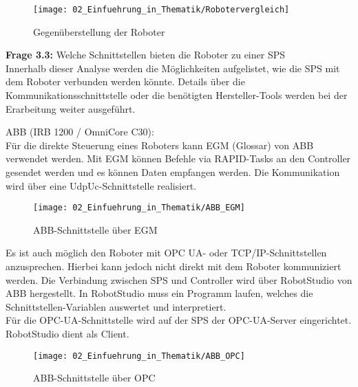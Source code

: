 		\begin{figure}[h!]
			\centering
			\texttt{[image: 02\_Einfuehrung\_in\_Thematik/Robotervergleich]}
			\captionsetup{justification=centering}
			\caption{Gegenüberstellung der Roboter}
			\label{fig:Robotervergleich}
		\end{figure}
	\vspace{3mm}
	
	\newpage
	
	\textbf{Frage 3.3:} Welche Schnittstellen bieten die Roboter zu einer SPS \vspace{2mm} 
	\\
		Innerhalb dieser Analyse werden die Möglichkeiten aufgelistet, wie die SPS mit dem Roboter verbunden werden könnte. Details über die Kommunikationsschnittstelle oder die benötigten Hersteller-Tools werden bei der Erarbeitung weiter ausgeführt.  
		\vspace{3mm}
		
		ABB (IRB 1200 / OmniCore C30):
		\vspace{2mm}
		\\
		Für die direkte Steuerung eines Roboters kann EGM (Glossar) von ABB verwendet werden.   Mit EGM können Befehle via RAPID-Tasks an den Controller gesendet werden und es können Daten empfangen werden. Die Kommunikation wird über eine UdpUc-Schnittstelle realisiert. 
		
		\begin{figure}[h!]
			\centering
			\texttt{[image: 02\_Einfuehrung\_in\_Thematik/ABB\_EGM]}
			\captionsetup{justification=centering}
			\caption{ABB-Schnittstelle über EGM}
			\label{fig:ABB_EGM}
		\end{figure}
		
		Es ist auch möglich den Roboter mit OPC UA- oder TCP/IP-Schnittstellen anzusprechen. Hierbei kann jedoch nicht direkt mit dem Roboter kommuniziert werden. Die Verbindung zwischen SPS und Controller wird über RobotStudio von ABB hergestellt. In RobotStudio muss ein Programm laufen, welches die Schnittstellen-Variablen auswertet und interpretiert.
		\\
		Für die OPC-UA-Schnittstelle wird auf der SPS der OPC-UA-Server eingerichtet. RobotStudio dient als Client.
		
		\begin{figure}[h!]
			\centering
			\texttt{[image: 02\_Einfuehrung\_in\_Thematik/ABB\_OPC]}
			\caption{ABB-Schnittstelle über OPC}
			\label{fig:ABB_OPC}
		\end{figure}
		\vspace{3mm}
		
